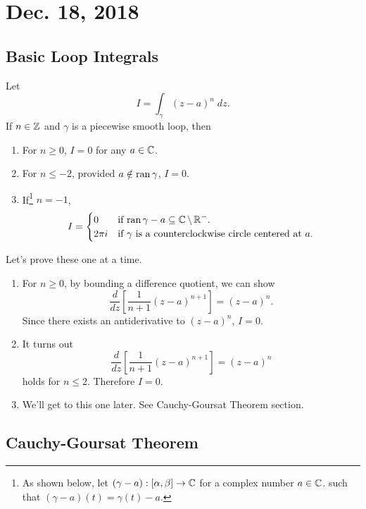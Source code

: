 \section{Dec. 18, 2018}
\subsection{Basic Loop Integrals}

\noindent
Let 
\[ I = \int_{\gamma} (z-a)^n \; dz. \]
If $n \in \operatorname{\mathbb{Z}}$ and $\gamma$  is a piecewise smooth loop, then
\begin{enumerate}
    \item For $n \ge 0$, $I = 0$ for any $a \in \operatorname{\mathbb{C}}$.
    \item For $n \le -2$, provided $a \notin \operatorname{ran}{\gamma}$,
        $I = 0$.
    \item If\footnote{As shown below, let $(\gamma - a): [\alpha, \beta] \to \operatorname{\mathbb{C}}$ for a complex number $a \in \operatorname{\mathbb{C}}$. 
                such that $(\gamma - a)(t) = \gamma(t) - a$.} $n = -1$,
        \[ I = \begin{cases}
                0 & \text{if $\operatorname{ran}{\gamma - a} \subseteq \operatorname{\mathbb{C}} \setminus \operatorname{\mathbb{R}}^-$.} \\
                2\pi i & \text{if $\gamma$ is a counterclockwise circle 
                centered at $a$.}
            \end{cases}
        \]
       
\end{enumerate}

Let's prove these one at a time.

\begin{enumerate}
    \item For $n \ge 0$, 
        by bounding a difference quotient, we can show
        \[ \frac{d}{dz} \left[ \frac{1}{n+1}(z-a)^{n+1}\right] =
        (z-a)^n. \]
        Since there exists an antiderivative to $(z-a)^n$,
        $I = 0$.
    \item It turns out
        \[ \frac{d}{dz} \left[ \frac{1}{n+1}(z-a)^{n+1}\right] =
        (z-a)^n \]
        holds for $n \le 2$.
        Therefore $I = 0$.
    \item We'll get to this one later.
        See Cauchy-Goursat Theorem section.
\end{enumerate}

\subsection{Cauchy-Goursat Theorem}

